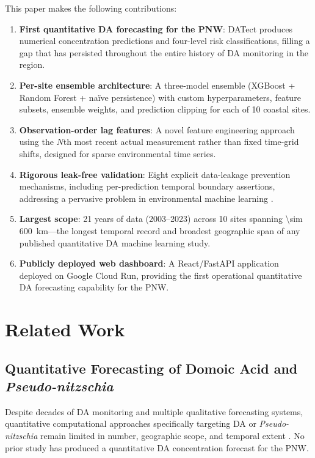 \documentclass[preprint,12pt,authoryear]{elsarticle}
\begin{document}
This paper makes the following contributions:
\begin{enumerate}[nosep]
    \item \textbf{First quantitative DA forecasting for the PNW}: DATect produces numerical concentration predictions and four-level risk classifications, filling a gap that has persisted throughout the entire history of DA monitoring in the region.
    \item \textbf{Per-site ensemble architecture}: A three-model ensemble (XGBoost + Random Forest + na\"ive persistence) with custom hyperparameters, feature subsets, ensemble weights, and prediction clipping for each of 10 coastal sites.
    \item \textbf{Observation-order lag features}: A novel feature engineering approach using the $N$th most recent actual measurement rather than fixed time-grid shifts, designed for sparse environmental time series.
    \item \textbf{Rigorous leak-free validation}: Eight explicit data-leakage prevention mechanisms, including per-prediction temporal boundary assertions, addressing a pervasive problem in environmental machine learning \citep{Kapoor2023}.
    \item \textbf{Largest scope}: 21 years of data (2003--2023) across 10 sites spanning \SI{\sim 600}{\kilo\meter}---the longest temporal record and broadest geographic span of any published quantitative DA machine learning study.
    \item \textbf{Publicly deployed web dashboard}: A React/FastAPI application deployed on Google Cloud Run, providing the first operational quantitative DA forecasting capability for the PNW.
\end{enumerate}


\section{Related Work}
\label{sec:related-work}

\subsection{Quantitative Forecasting of Domoic Acid and \textit{Pseudo-nitzschia}}
\label{sec:rw-da-forecasting}

Despite decades of DA monitoring and multiple qualitative forecasting systems, quantitative computational approaches specifically targeting DA or \textit{Pseudo-nitzschia} remain limited in number, geographic scope, and temporal extent \citep{Anderson2012, McGillicuddy2010}. No prior study has produced a quantitative DA concentration forecast for the PNW.
\end{document}
